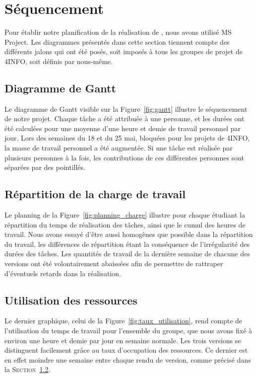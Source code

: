 \section{Séquencement}
	\label{sec:sequencement}
	Pour établir notre planification de la réalisation de \glasir{}, nous avons utilisé MS Project. Les diagrammes présentés dans cette section tiennent compte des différents jalons qui ont été posés, soit imposés à tous les groupes de projet de 4INFO, soit définis par nous-même.

    \subsection{Diagramme de Gantt}
        Le diagramme de Gantt visible sur la {\sc Figure}~\ref{fig:gantt} illustre le séquencement de notre projet. Chaque tâche a été attribuée à une personne, et les durées ont été calculées pour une moyenne d'une heure et demie de travail personnel par jour. Lors des semaines du 18 et du 25 mai, bloquées pour les projets de 4INFO, la masse de travail personnel a été augmentée. Si une tâche est réalisée par plusieurs personnes à la fois, les contributions de ces différentes personnes sont séparées par des pointillés.
    
    \subsection{Répartition de la charge de travail}
    \label{subsec:repartition_charge}
        Le planning de la {\sc Figure}~\ref{fig:planning_charge} illustre pour chaque étudiant la répartition du temps de réalisation des tâches, ainsi que le cumul des heures de travail. Nous avons essayé d'être aussi homogènes que possible dans la répartition du travail, les différences de répartition étant la conséquence de l'irrégularité des durées des tâches. Les quantités de travail de la dernière semaine de chacune des versions ont été volontairement abaissées afin de permettre de rattraper d'éventuels retards dans la réalisation.

    \subsection{Utilisation des ressources}
		Le dernier graphique, celui de la {\sc Figure}~\ref{fig:taux_utilisation}, rend compte de l'utilisation du temps de travail pour l'ensemble du groupe, que nous avons fixé à environ une heure et demie par jour en semaine normale. Les trois versions se distinguent facilement grâce au taux d'occupation des ressources. Ce dernier est en effet moindre une semaine entre chaque rendu de version, comme précisé dans la \textsc{Section}~\ref{subsec:repartition_charge}.

